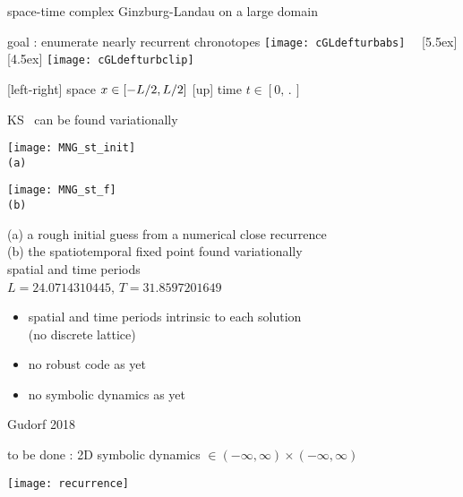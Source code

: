 \begin{frame}{space-time complex Ginzburg-Landau on a large domain}
\begin{block}{goal : enumerate nearly recurrent chronotopes}
  \texttt{[image: cGLdefturbabs]}%
~~\raisebox{+3.33ex}[5.5ex][4.5ex]
		 {\texttt{[image: cGLdefturbclip]}}
\end{block}

{\footnotesize
[left-right] space $x \in [-L/2,L/2]$
\qquad
{[up]} time $t\in [0,\period{}]$
}
\end{frame}

\begin{frame}{KS \twots\ can be found variationally}
\begin{minipage}[height=.32\textheight]{.45\textwidth}
\centering
\texttt{[image: MNG\_st\_init]}
\\  \small{\texttt{(a)}}
\end{minipage}
\begin{minipage}[height=.32\textheight]{.45\textwidth}
\centering
\texttt{[image: MNG\_st\_f]}
\\\small{\texttt{(b)}}
\end{minipage}

\medskip
(a) a rough initial guess from a numerical close recurrence\\
(b) the spatiotemporal fixed point found variationally\\
 spatial and time periods \\
 $L=24.0714310445$, $T=31.8597201649$


\begin{itemize}
\item spatial and time periods intrinsic to each solution \\ (no discrete lattice)
\item no robust code as yet
\item no symbolic dynamics as yet
\end{itemize}
\vfill\hfill        Gudorf 2018
\end{frame}


\begin{frame}{
to be done : 2D symbolic dynamics
$\in (-\infty, \infty)\times (-\infty, \infty)$
             }
\begin{center}
\texttt{[image: recurrence]}
\end{center}

\end{frame}


